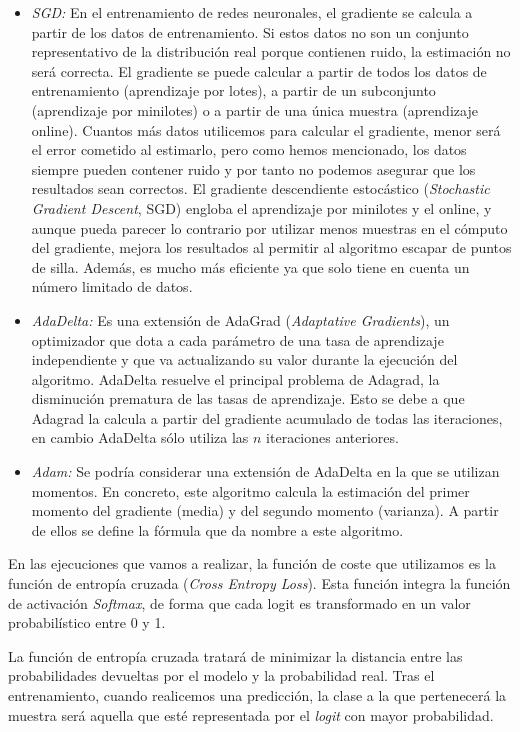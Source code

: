 \begin{itemize}
    \begin{itemize}
        \item \textit{SGD:} En el entrenamiento de redes neuronales, el gradiente se calcula a partir de los datos de entrenamiento. Si estos datos no son un conjunto representativo de la distribución real porque contienen ruido, la estimación no será correcta. El gradiente se puede calcular a partir de todos los datos de entrenamiento (aprendizaje por lotes), a partir de un subconjunto (aprendizaje por minilotes) o a partir de una única muestra (aprendizaje online). Cuantos más datos utilicemos para calcular el gradiente, menor será el error cometido al estimarlo, pero como hemos mencionado, los datos siempre pueden contener ruido y por tanto no podemos asegurar que los resultados sean correctos. El gradiente descendiente estocástico (\textit{Stochastic Gradient Descent}, SGD) engloba el aprendizaje por minilotes y el online, y aunque pueda parecer lo contrario por utilizar menos muestras en el cómputo del gradiente, mejora los resultados al permitir al algoritmo escapar de puntos de silla. Además, es mucho más eficiente ya que solo tiene en cuenta un número limitado de datos.
        \item \textit{AdaDelta:} Es una extensión de AdaGrad (\textit{Adaptative Gradients}), un optimizador que dota a cada parámetro de una tasa de aprendizaje independiente y que va actualizando su valor durante la ejecución del algoritmo. AdaDelta resuelve el principal problema de Adagrad, la disminución prematura de las tasas de aprendizaje. Esto se debe a que Adagrad la calcula a partir del gradiente acumulado de todas las iteraciones, en cambio AdaDelta sólo utiliza las $n$ iteraciones anteriores.
        \item \textit{Adam:} Se podría considerar una extensión de AdaDelta en la que se utilizan momentos. En concreto, este algoritmo calcula la estimación del primer momento del gradiente (media) y del segundo momento (varianza). A partir de ellos se define la fórmula que da nombre a este algoritmo.
    \end{itemize}
\end{itemize}

En las ejecuciones que vamos a realizar, la función de coste que utilizamos es la función de entropía cruzada (\textit{Cross Entropy Loss}). Esta función integra la función de activación \textit{Softmax}, de forma que cada logit es transformado en un valor probabilístico entre 0 y 1. 


La función de entropía cruzada tratará de minimizar la distancia entre las probabilidades devueltas por el modelo y la probabilidad real. Tras el entrenamiento, cuando realicemos una predicción, la clase a la que pertenecerá la muestra será aquella que esté representada por el \textit{logit} con mayor probabilidad. \cite{crossentropyloss}

